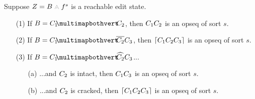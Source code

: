 \begin{theorem}
  Suppose $Z = \zipper{\subject}{\tfrelem^s}$ is a reachable edit state.
  \begin{enumerate}
  \item[(1)] If $\subject = \pointing{\selection_1}{\selection_2}$,
    then $C_1C_2$ is an opseq of sort $s$.
  \item[(2)] If $\subject = \selecting{\selection_1}{\selection_2}{\selection_3}$,
    then $\left\lceil C_1C_2C_3\right\rceil$ is an opseq of sort $s$.
  \item[(3)] If $\subject = \restructuring{\selection_1}{\selection_2}{\selection_3}$...
    \begin{enumerate}
      \item[(a)] ...and $C_2$ is intact, then
        $C_1C_3$ is an opseq of sort $s$.
      \item[(b)] ...and $C_2$ is cracked, then
        $\left\lceil C_1C_2C_3\right\rceil$ is an opseq of sort $s$.
    \end{enumerate}
  \end{enumerate}
\end{theorem}


